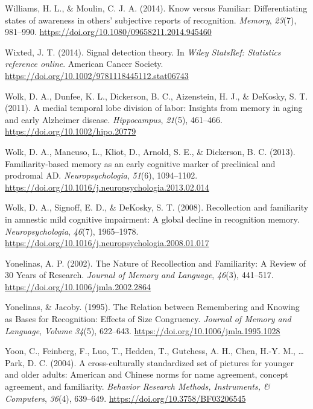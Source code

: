 \documentclass[
  11pt,
]{article}
\begin{document}
\leavevmode\hypertarget{ref-williams2014}{}%
Williams, H. L., \& Moulin, C. J. A. (2014). Know versus Familiar:
Differentiating states of awareness in others' subjective reports of
recognition. \emph{Memory}, \emph{23}(7), 981--990.
\url{https://doi.org/10.1080/09658211.2014.945460}

\leavevmode\hypertarget{ref-doi:https:ux2fux2fdoi.orgux2f10.1002ux2f9781118445112.stat06743}{}%
Wixted, J. T. (2014). Signal detection theory. In \emph{Wiley StatsRef:
Statistics reference online}. American Cancer Society.
\url{https://doi.org/10.1002/9781118445112.stat06743}

\leavevmode\hypertarget{ref-wolk2011}{}%
Wolk, D. A., Dunfee, K. L., Dickerson, B. C., Aizenstein, H. J., \&
DeKosky, S. T. (2011). A medial temporal lobe division of labor:
Insights from memory in aging and early Alzheimer disease.
\emph{Hippocampus}, \emph{21}(5), 461--466.
\url{https://doi.org/10.1002/hipo.20779}

\leavevmode\hypertarget{ref-wolk2013}{}%
Wolk, D. A., Mancuso, L., Kliot, D., Arnold, S. E., \& Dickerson, B. C.
(2013). Familiarity-based memory as an early cognitive marker of
preclinical and prodromal AD. \emph{Neuropsychologia}, \emph{51}(6),
1094--1102. \url{https://doi.org/10.1016/j.neuropsychologia.2013.02.014}

\leavevmode\hypertarget{ref-wolk2008}{}%
Wolk, D. A., Signoff, E. D., \& DeKosky, S. T. (2008). Recollection and
familiarity in amnestic mild cognitive impairment: A global decline in
recognition memory. \emph{Neuropsychologia}, \emph{46}(7), 1965--1978.
\url{https://doi.org/10.1016/j.neuropsychologia.2008.01.017}

\leavevmode\hypertarget{ref-yonelinas2002}{}%
Yonelinas, A. P. (2002). The Nature of Recollection and Familiarity: A
Review of 30 Years of Research. \emph{Journal of Memory and Language},
\emph{46}(3), 441--517. \url{https://doi.org/10.1006/jmla.2002.2864}

\leavevmode\hypertarget{ref-yonelinas1995a}{}%
Yonelinas, \& Jacoby. (1995). The Relation between Remembering and
Knowing as Bases for Recognition: Effects of Size Congruency.
\emph{Journal of Memory and Language}, \emph{Volume 34}(5), 622--643.
\url{https://doi.org/10.1006/jmla.1995.1028}

\leavevmode\hypertarget{ref-yoon2004}{}%
Yoon, C., Feinberg, F., Luo, T., Hedden, T., Gutchess, A. H., Chen,
H.-Y. M., \ldots{} Park, D. C. (2004). A cross-culturally standardized
set of pictures for younger and older adults: American and Chinese norms
for name agreement, concept agreement, and familiarity. \emph{Behavior
Research Methods, Instruments, \& Computers}, \emph{36}(4), 639--649.
\url{https://doi.org/10.3758/BF03206545}
\end{document}
